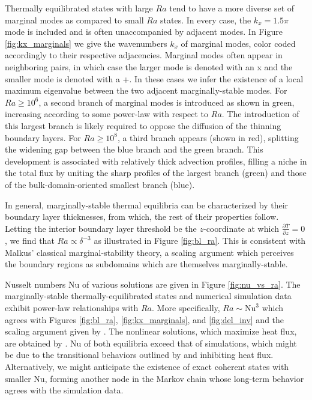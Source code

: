 \documentclass[reprint,amsmath,amssymb,aps]{revtex4-1}
\newcommand\Nu{\mathrm{Nu}}
\begin{document}
Thermally equilibrated states with large $Ra$ tend to have a more diverse set of marginal modes as compared to small $Ra$ states. 
In every case, the $k_x = 1.5\pi$ mode is included and is often unaccompanied by adjacent modes. 
In Figure \ref{fig:kx_marginals} we give the wavenumbers $k_x$ of marginal modes, color coded accordingly to their respective adjacencies. 
Marginal modes often appear in neighboring pairs, in which case the larger mode is denoted with an x and the smaller mode is denoted with a +. 
In these cases we infer the existence of a local maximum eigenvalue between the two adjacent marginally-stable modes. 
For $Ra \geq 10^6$, a second branch of marginal modes is introduced as shown in green, increasing according to some power-law with respect to $Ra$. 
The introduction of this largest branch is likely required to oppose the diffusion of the thinning boundary layers. 
For $Ra \geq 10^8$, a third branch appears (shown in red), splitting the widening gap between the blue branch and the green branch. 
This development is associated with relatively thick advection profiles, filling a niche in the total flux by uniting the sharp profiles of the largest branch (green) and those of the bulk-domain-oriented smallest branch (blue).

In general, marginally-stable thermal equilibria can be characterized by their boundary layer thicknesses, from which, the rest of their properties follow. Letting the interior boundary layer threshold be the $z$-coordinate at which $\frac{\partial \bar{T}}{\partial z} = 0$, we find that $Ra \propto  \delta^{-3}$ as illustrated in Figure \ref{fig:bl_ra}. 
This is consistent with Malkus' classical marginal-stability theory, a scaling argument which perceives the boundary regions as subdomains which are themselves marginally-stable.

Nusselt numbers $\Nu$ of various solutions are given in Figure \ref{fig:nu_vs_ra}. 
The marginally-stable thermally-equilibrated states and numerical simulation data exhibit power-law relationships with $Ra$. 
More specifically, $Ra \sim \Nu^3$ which agrees with Figures \ref{fig:bl_ra}, \ref{fig:kx_marginals}, and \ref{fig:del_inv} and the scaling argument given by \cite{Malkus}. 
The nonlinear solutions, which maximize heat flux, are obtained by \cite{Waleffe}. 
$\Nu$ of both equilibria exceed that of simulations, which might be due to the transitional behaviors outlined by \cite{Yalniz} and \cite{Cvitanovic} inhibiting heat flux. 
Alternatively, we might anticipate the existence of exact coherent states with smaller $\Nu$, forming another node in the Markov chain whose long-term behavior agrees with the simulation data.
\end{document}
